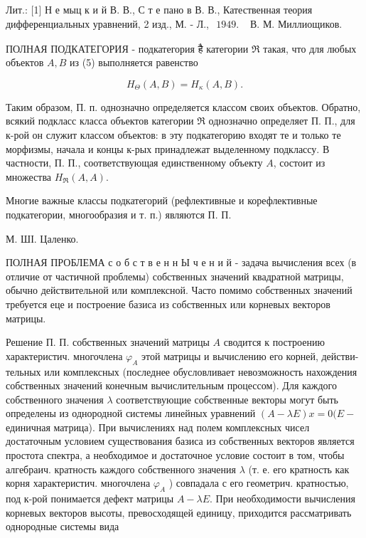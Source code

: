 \documentclass[10pt]{article}
\begin{document}
Лит.: [1] Н е мыц к и й В. В., С т е пано в В. В., Катественная теория дифференциальных уравнений, 2 изд., М. - Л., $\begin{array}{ll}1949 . & \text { В. М. Миллиощиков. }\end{array}$



ПОЛНАЯ ПОДКАТЕГОРИЯ - подкатегория है категории $\Re$ такая, что для любых объектов $A, B$ из (5) выполняется равенство



\[

H_{\Theta}(A, B)=H_{\mathfrak{\kappa}}(A, B) .

\]



Таким образом, П. п. однозначно определяется классом своих объектов. Обратно, всякий подкласс класса объектов категории $\Re$ однозначно определяет П. П., для к-рой он служит классом объектов: в эту подкатегорию входят те и только те морфизмы, начала и концы к-рых принадлежат выделенному подклассу. В частности, П. П., соответствующая единственному объекту $A$, состоит из множества $H_{\Re}(A, A)$.



Многие важные классы подкатегорий (рефлективные и корефлективные подкатегории, многообразия и т. п.) являются П. П.



М. ШІ. Цаленко.



ПОЛНАЯ ПРОБЛЕМА с о б с т в е н н Ы ч е н и й - задача вычисления всех (в отличие от частичной проблемы) собственных значений квадратной матрицы, обычно действительной или комплексной. Часто помимо собственных значений требуется еце и построение базиса из собственных или корневых векторов матрицы.



Решение П. П. собственных значений матрицы $A$ сводится к построению характеристич. многочлена $\varphi_{A}$ этой матрицы и вычислению его корней, действи- тельных или комплексных (последнее обусловливает невозможность нахождения собственных значений конечным вычислительным процессом). Для каждого собственного значения $\lambda$ соответствующие собственные векторы могут быть определены из однородной системы линейных уравнений $(A-\lambda E) x=0(E-$ единичная матрица). При вычислениях над полем комплексных чисел достаточным условием существования базиса из собственных векторов является простота спектра, а необходимое и достаточное условие состоит в том, чтобы алгебраич. кратность каждого собственного значения $\lambda$ (т. е. его кратность как корня характеристич. многочлена $\varphi_{A}$ ) совпадала с его геометрич. кратностью, под к-рой понимается дефект матрицы $A-\lambda E$. При необходимости вычисления корневых векторов высоты, превосходящей единицу, приходится рассматривать однородные системы вида
\end{document}
